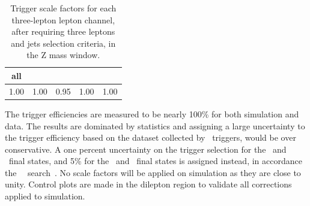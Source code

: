 \begin{table}[htbp]
	\centering
	\caption{Trigger scale factors for each three-lepton lepton channel, after requiring three leptons and jets selection criteria, in the Z mass window.}
	\begin{tabular}{ccccc}
		\toprule 
		all & \mumumu & \eee & \eemu & \emumu \\ 
		\midrule 
		1.00 & 1.00 & 0.95 & 1.00  & 1.00 \\ 
		\bottomrule
	\end{tabular} 
	\label{tab:trigSFe}
\end{table}

%	
The trigger efficiencies are measured to be nearly 100\% for both simulation and data. The results are dominated by statistics and assigning a large uncertainty to the trigger efficiency based on the dataset collected by \Etmis\ triggers, would be over conservative. A one percent uncertainty on the trigger selection for the \eemu\ and \mumumu\ final states, and 5\% for the \eee\ and \emumu\ final states is assigned instead, in accordance the \SM\ \tZq\ search~\cite{CMS-PAS-TOP-16-020}. No scale factors will be applied on simulation as they are close to unity. Control plots are made in the dilepton region to validate all corrections applied to simulation.

